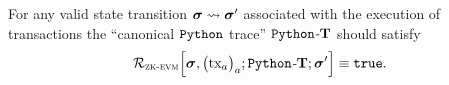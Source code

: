 \begin{thm}
	For any valid state transition $\bm{\sigma} \rightsquigarrow \bm{\sigma}'$ associated with the execution of transactions the ``canonical $\mathtt{Python}{}$ trace'' $\mathtt{Python}\emph{\text{-}}\textbf{T}$ should satisfy
	\[
		\mathcal{R}_{\textsc{zk-evm}}
		\Big[ \bm{\sigma}, \big(\text{tx}_a\big)_{a};
		\mathtt{Python} \emph{\text{-}}\textbf{T};
		\bm{\sigma}' \Big]
		\equiv \mathtt{true}.
	\]
\end{thm}

